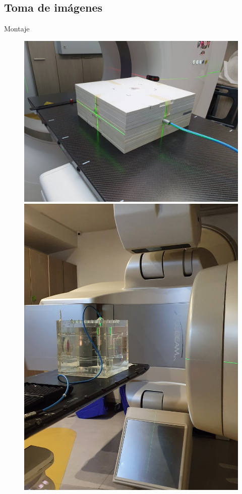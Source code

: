 \documentclass[12pt]{beamer}
\begin{document}
\subsection{Toma de imágenes}

\begin{frame}{Montaje}
\begin{figure}[htp]%
	\centering
	\begin{minipage}{0.45\textwidth}
		\includegraphics[width=\textwidth]{images/20200826_153715.jpg}
	\end{minipage}\hfill
	\begin{minipage}{0.45\textwidth}
		\includegraphics[width=\textwidth]{images/20200826_205548.jpg}

\end{minipage}
\end{figure}
\end{frame}
\end{document}
